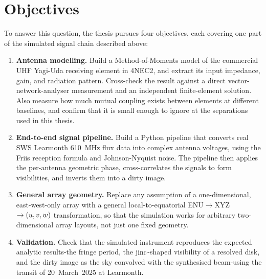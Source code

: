 \section{Objectives}
\label{sec:objectives}
To answer this question, the thesis pursues four objectives, each covering one
part of the simulated signal chain described above:
\begin{enumerate}[leftmargin=1.8em]
  \item \textbf{Antenna modelling.} Build a Method-of-Moments model of the
        commercial UHF Yagi-Uda receiving element in 4NEC2, and extract its
        input impedance, gain, and radiation pattern. Cross-check the result
        against a direct vector-network-analyser measurement and an
        independent finite-element solution. Also measure how much mutual
        coupling exists between elements at different baselines, and confirm
        that it is small enough to ignore at the separations used in this
        thesis.
  \item \textbf{End-to-end signal pipeline.} Build a Python pipeline that
        converts real SWS Learmonth \SI{610}{\mega\hertz} flux data into
        complex antenna voltages, using the Friis reception formula and
        Johnson-Nyquist noise. The pipeline then applies the per-antenna
        geometric phase, cross-correlates the signals to form visibilities,
        and inverts them into a dirty image.
  \item \textbf{General array geometry.} Replace any assumption of a
        one-dimensional, east-west-only array with a general
        local-to-equatorial ENU$\rightarrow$XYZ$\rightarrow(u,v,w)$
        transformation, so that the simulation works for arbitrary
        two-dimensional array layouts, not just one fixed geometry.
  \item \textbf{Validation.} Check that the simulated instrument reproduces
        the expected analytic results-the fringe period, the $\operatorname{jinc}$-shaped
        visibility of a resolved disk, and the dirty image as the sky
        convolved with the synthesised beam-using the transit of
        \mbox{20 March 2025} at Learmonth.
\end{enumerate}

